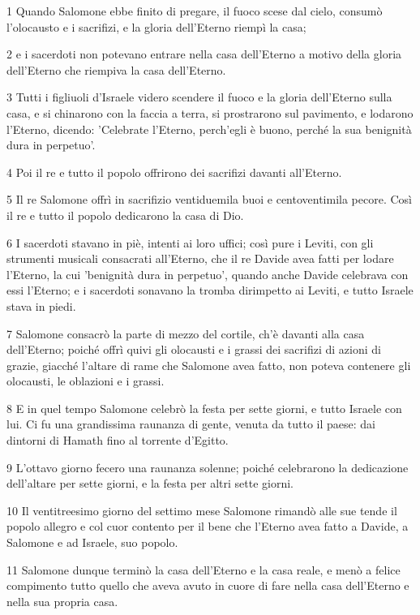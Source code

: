 \par 1 Quando Salomone ebbe finito di pregare, il fuoco scese dal cielo, consumò l'olocausto e i sacrifizi, e la gloria dell'Eterno riempì la casa;
\par 2 e i sacerdoti non potevano entrare nella casa dell'Eterno a motivo della gloria dell'Eterno che riempiva la casa dell'Eterno.
\par 3 Tutti i figliuoli d'Israele videro scendere il fuoco e la gloria dell'Eterno sulla casa, e si chinarono con la faccia a terra, si prostrarono sul pavimento, e lodarono l'Eterno, dicendo: 'Celebrate l'Eterno, perch'egli è buono, perché la sua benignità dura in perpetuo'.
\par 4 Poi il re e tutto il popolo offrirono dei sacrifizi davanti all'Eterno.
\par 5 Il re Salomone offrì in sacrifizio ventiduemila buoi e centoventimila pecore. Così il re e tutto il popolo dedicarono la casa di Dio.
\par 6 I sacerdoti stavano in piè, intenti ai loro uffici; così pure i Leviti, con gli strumenti musicali consacrati all'Eterno, che il re Davide avea fatti per lodare l'Eterno, la cui 'benignità dura in perpetuo', quando anche Davide celebrava con essi l'Eterno; e i sacerdoti sonavano la tromba dirimpetto ai Leviti, e tutto Israele stava in piedi.
\par 7 Salomone consacrò la parte di mezzo del cortile, ch'è davanti alla casa dell'Eterno; poiché offrì quivi gli olocausti e i grassi dei sacrifizi di azioni di grazie, giacché l'altare di rame che Salomone avea fatto, non poteva contenere gli olocausti, le oblazioni e i grassi.
\par 8 E in quel tempo Salomone celebrò la festa per sette giorni, e tutto Israele con lui. Ci fu una grandissima raunanza di gente, venuta da tutto il paese: dai dintorni di Hamath fino al torrente d'Egitto.
\par 9 L'ottavo giorno fecero una raunanza solenne; poiché celebrarono la dedicazione dell'altare per sette giorni, e la festa per altri sette giorni.
\par 10 Il ventitreesimo giorno del settimo mese Salomone rimandò alle sue tende il popolo allegro e col cuor contento per il bene che l'Eterno avea fatto a Davide, a Salomone e ad Israele, suo popolo.
\par 11 Salomone dunque terminò la casa dell'Eterno e la casa reale, e menò a felice compimento tutto quello che aveva avuto in cuore di fare nella casa dell'Eterno e nella sua propria casa.
